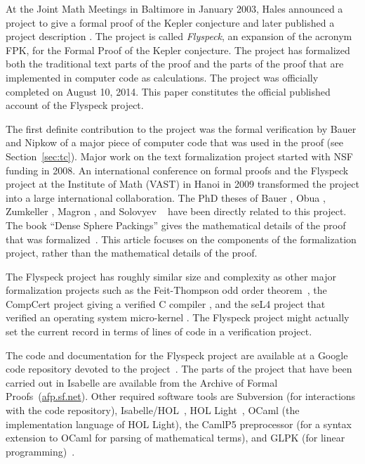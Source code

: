 At the Joint Math Meetings in Baltimore in January 2003, Hales announced a
project to give a formal proof of the Kepler conjecture and later
published a project description \cite{hales:DSP:2006:432}.
The project is called {\it Flyspeck}, an expansion of the acronym
FPK, for the Formal Proof of the Kepler conjecture.  The project has
formalized both the traditional text parts of the proof and the
parts of the proof that are implemented in computer code as
calculations.  The project was officially completed on August 10, 2014.
This paper constitutes the official published account
of the Flyspeck project.  

The first definite contribution to the project was the formal
verification by Bauer and Nipkow of a major piece of computer code
that was used in the proof (see Section~\ref{sec:tc}).  Major work on
the text formalization project started with NSF funding in 2008.  An
international conference on formal proofs and the Flyspeck project
at the Institute of Math (VAST) in Hanoi in 2009 transformed the project
into a large international collaboration.  The PhD theses of Bauer
\cite{Bauer:2006:Thesis}, Obua \cite{Obua:2005:Thesis}, Zumkeller
\cite{roland-thesis}, Magron \cite{Magron:3013:Thesis}, and
Solovyev ~\cite{Solovyev-thesis} have been directly related to this
project.  The book ``Dense Sphere Packings'' gives the mathematical
details of the proof that was formalized~\cite{DSP}.  This article
focuses on the components of the formalization project, rather than
the mathematical details of the proof.

The Flyspeck project has roughly similar size and complexity as other
major formalization projects such as the Feit-Thompson odd order
theorem~\cite{gonthier2013machine}, the CompCert project giving a
verified C compiler \cite{CC}, and the seL4 project that verified an
operating system micro-kernel \cite{Klein-SOSP09}.  The Flyspeck
project might actually set the current record in terms of lines of
code in a verification project.  


The code and documentation for the Flyspeck project are available at a
Google code repository devoted to the
project~\cite{website:FlyspeckProject}.  The parts of the project that
have been carried out in Isabelle are available from the Archive of
Formal Proofs~(\url{afp.sf.net}).  Other required software tools are
Subversion (for interactions with the code repository),
Isabelle/HOL~\cite{LNCS2283}, HOL Light~\cite{HOLL}, OCaml (the
implementation language of HOL Light), the CamlP5 preprocessor (for a
syntax extension to OCaml for parsing of mathematical terms), and GLPK
(for linear programming)~\cite{website:GLPK}.

